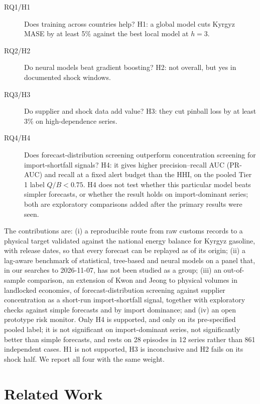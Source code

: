 \documentclass[conference]{IEEEtran}
\begin{document}
\begin{description}
\item[RQ1/H1] Does training across countries help? H1: a global model cuts Kyrgyz MASE by at least 5\% against the best local model at $h=3$.
\item[RQ2/H2] Do neural models beat gradient boosting? H2: not overall, but yes in documented shock windows.
\item[RQ3/H3] Do supplier and shock data add value? H3: they cut pinball loss by at least 3\% on high-dependence series.
\item[RQ4/H4] Does forecast-distribution screening outperform concentration screening for import-shortfall signals? H4: it gives higher precision--recall AUC (PR-AUC) and recall at a fixed alert budget than the HHI, on the pooled Tier 1 label $Q/B<0.75$. H4 does not test whether this particular model beats simpler forecasts, or whether the result holds on import-dominant series; both are exploratory comparisons added after the primary results were seen.
\end{description}

The contributions are: (i) a reproducible route from raw customs records to a physical target validated against the national energy balance for Kyrgyz gasoline, with release dates, so that every forecast can be replayed as of its origin; (ii) a lag-aware benchmark of statistical, tree-based and neural models on a panel that, in our searches to 2026-11-07, has not been studied as a group; (iii) an out-of-sample comparison, an extension of Kwon and Jeong \cite{kwon2026} to physical volumes in landlocked economies, of forecast-distribution screening against supplier concentration as a short-run import-shortfall signal, together with exploratory checks against simple forecasts and by import dominance; and (iv) an open prototype risk monitor. Only H4 is supported, and only on its pre-specified pooled label; it is not significant on import-dominant series, not significantly better than simple forecasts, and rests on 28 episodes in 12 series rather than 861 independent cases. H1 is not supported, H3 is inconclusive and H2 fails on its shock half. We report all four with the same weight.

\section{Related Work}\label{sec:related}
\end{document}
